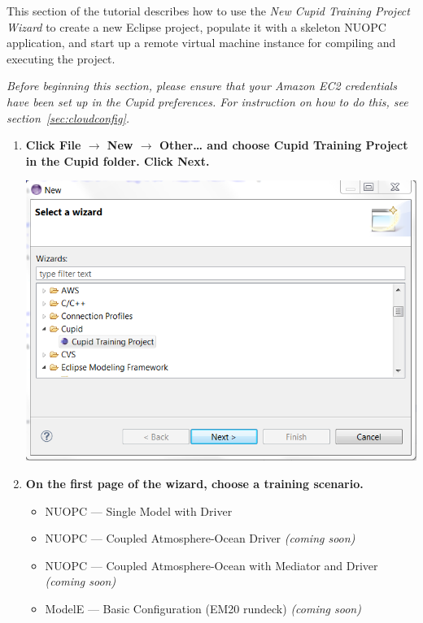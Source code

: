 \documentclass[oneside,11pt]{memoir}
\begin{document}
This section of the tutorial describes how to use the \emph{New Cupid Training Project Wizard} to create a new Eclipse project, populate it with a skeleton NUOPC application, and start up a remote virtual machine instance for compiling and executing the project.

\emph{Before beginning this section, please ensure that your Amazon EC2 credentials have been set up in the Cupid preferences. For instruction on how to do this, see section~\ref{sec:cloudconfig}.}

\begin{enumerate}

\item \textbf{Click File $\rightarrow$ New $\rightarrow$ Other… and choose Cupid Training Project in the Cupid folder.  Click Next.}

\parbox{\linewidth}{\centering
  \includegraphics{figs/cloud_fig1.png}
}


\item \textbf{On the first page of the wizard, choose a training scenario.  }

\begin{itemize}
\item NUOPC --- Single Model with Driver
\item NUOPC --- Coupled Atmosphere-Ocean Driver  \emph{(coming soon)}
\item NUOPC --- Coupled Atmosphere-Ocean with Mediator and Driver \emph{(coming soon)}
\item ModelE --- Basic Configuration (EM20 rundeck) \emph{(coming soon)}
\end{itemize}


\end{enumerate}
\end{document}

